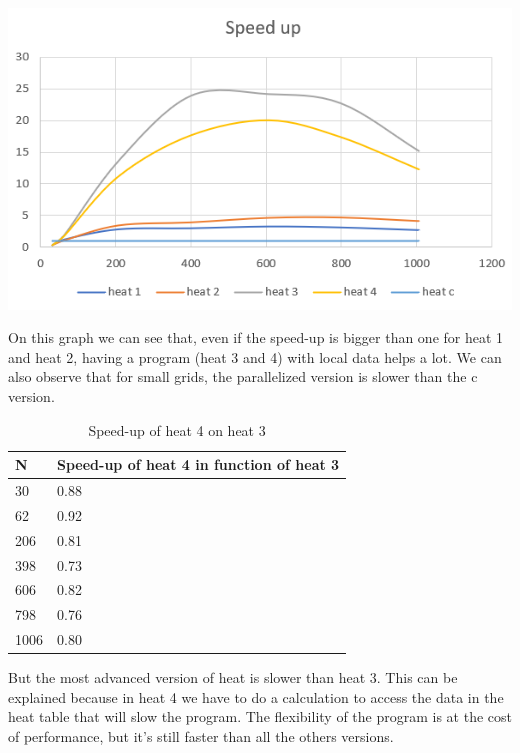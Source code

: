 \documentclass{report}
\begin{document}
\begin{center}
    \includegraphics[scale=1]{Images/speed-up_function_N.png}
    \label{fig9}
\end{center}

On this graph we can see that, even if the speed-up is bigger than one for heat 1 and heat 2, having a program (heat 3 and 4) with local data helps a lot.
We can also observe that for small grids, the parallelized version is slower than the c version. 

\begin{table}[h]
\centering
\caption{Speed-up of heat 4 on heat 3}
\label{tab:my-table}
\begin{tabular}{l|l}
N    & Speed-up of heat 4 in function of heat 3 \\ \hline
30   & 0.88                                     \\
62   & 0.92                                     \\
206  & 0.81                                     \\
398  & 0.73                                     \\
606  & 0.82                                     \\
798  & 0.76                                     \\
1006 & 0.80                                    
\end{tabular}
\end{table}

But the most advanced version of heat is slower than heat 3. This can be explained because in heat 4 we have to do a calculation to access the data in the heat table that will slow the program. The flexibility of the program is at the cost of performance, but it's still faster than all the others versions.
\end{document}
